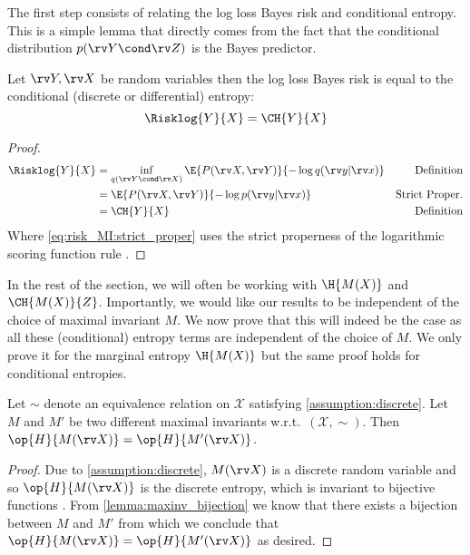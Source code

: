 \documentclass[final]{article}
\begin{document}
The first step consists of relating the log loss Bayes risk and conditional entropy. 
This is a simple lemma that directly comes from the fact that the conditional distribution $p(\rv Y \cond \rv Z)$  is the Bayes predictor.

\begin{lemma}\label{lemma:risk_entropy}
Let $\rv Y, \rv X$ be random variables then the log loss Bayes risk is equal to the conditional (discrete or differential) entropy:
\begin{equation}
\Risklog{Y}{X}= \CH{Y}{X}
\end{equation}
\end{lemma}
\begin{proof}
\begin{align}
\Risklog{Y}{X} 
&=  \inf_{q(\rv Y \cond \rv X)} \E{P(\rv X, \rv Y)}{- \log q(\rv y|\rv x)} & \text{Definition} \\
&=  \E{P(\rv X, \rv Y)}{- \log p(\rv y|\rv x)} 
& \text{Strict Proper.} \label{eq:risk_MI:strict_proper} \\
&= \CH{Y}{X} 
& \text{Definition}  
\end{align}
Where \cref{eq:risk_MI:strict_proper} uses the strict properness of the logarithmic scoring function rule \citep{gneiting_strictly_2007}.
\end{proof}

In the rest of the section, we will often be working with $\H{M(X)}$ and  $\CH{M(X)}{Z}$. 
Importantly, we would like our results to be independent of the choice of maximal invariant $M$.
We now prove that this will indeed be the case as all these (conditional) entropy terms are independent of the choice of $M$.
We only prove it for the marginal entropy $\H{M(X)}$ but the same proof holds for conditional entropies.

\begin{lemma}\label{lemma:same_entropy}
Let $\sim$ denote an equivalence relation on $\mathcal{X}$ satisfying \cref{assumption:discrete}.
Let $M$ and $M'$ be two different maximal invariants w.r.t.\  $(\mathcal{X}, \sim)$. Then $\op{H}{M(\rv X)} = \op{H}{M'(\rv X)}$.
\end{lemma}
\begin{proof}
Due to \cref{assumption:discrete}, $M(\rv X)$ is a discrete random variable and so $\op{H}{M(\rv X)}$ is the discrete entropy, which is invariant to bijective functions \cite{kraskov_estimating_2004}.
From \cref{lemma:maxinv_bijection} we know that there exists a bijection between $M$ and $M'$ from which we conclude that $\op{H}{M(\rv X)}=\op{H}{M'(\rv X)}$ as desired.
\end{proof}
\end{document}
